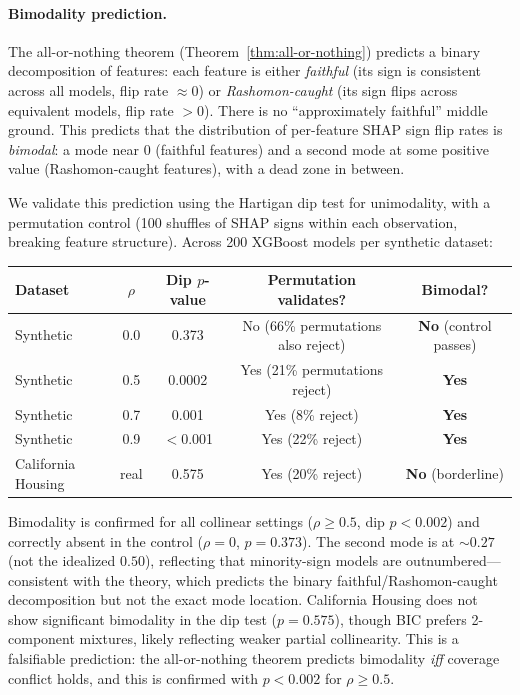 \documentclass{article}
\begin{document}
\paragraph{Bimodality prediction.}
The all-or-nothing theorem (Theorem~\ref{thm:all-or-nothing}) predicts a binary decomposition of features: each feature is either \emph{faithful} (its sign is consistent across all models, flip rate $\approx 0$) or \emph{Rashomon-caught} (its sign flips across equivalent models, flip rate $> 0$).
There is no ``approximately faithful'' middle ground.
This predicts that the distribution of per-feature SHAP sign flip rates is \emph{bimodal}: a mode near $0$ (faithful features) and a second mode at some positive value (Rashomon-caught features), with a dead zone in between.

We validate this prediction using the Hartigan dip test for unimodality, with a permutation control (100 shuffles of SHAP signs within each observation, breaking feature structure).
Across 200 XGBoost models per synthetic dataset:

\begin{center}
\small
\begin{tabular}{@{}lcccc@{}}
\toprule
Dataset & $\rho$ & Dip $p$-value & Permutation validates? & Bimodal? \\
\midrule
Synthetic & 0.0 & 0.373 & No (66\% permutations also reject) & \textbf{No} (control passes) \\
Synthetic & 0.5 & 0.0002 & Yes (21\% permutations reject) & \textbf{Yes} \\
Synthetic & 0.7 & 0.001 & Yes (8\% reject) & \textbf{Yes} \\
Synthetic & 0.9 & $<$0.001 & Yes (22\% reject) & \textbf{Yes} \\
California Housing & real & 0.575 & Yes (20\% reject) & \textbf{No} (borderline) \\
\bottomrule
\end{tabular}
\end{center}

Bimodality is confirmed for all collinear settings ($\rho \geq 0.5$, dip $p < 0.002$) and correctly absent in the control ($\rho = 0$, $p = 0.373$).
The second mode is at ${\sim}0.27$ (not the idealized $0.50$), reflecting that minority-sign models are outnumbered---consistent with the theory, which predicts the binary faithful/Rashomon-caught decomposition but not the exact mode location.
California Housing does not show significant bimodality in the dip test ($p = 0.575$), though BIC prefers 2-component mixtures, likely reflecting weaker partial collinearity.
This is a falsifiable prediction: the all-or-nothing theorem predicts bimodality \emph{iff} coverage conflict holds, and this is confirmed with $p < 0.002$ for $\rho \geq 0.5$.
\end{document}
